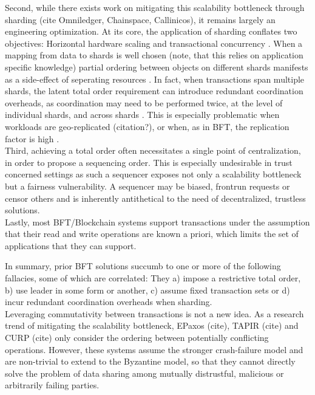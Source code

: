 Second, while there exists work on mitigating this scalability bottleneck through sharding (cite Omniledger, Chainspace, Callinicos), it remains largely an engineering optimization. At its core, the application of sharding conflates two objectives: Horizontal hardware scaling and transactional concurrency . When a mapping from data to shards is well chosen (note, that this relies on application specific knowledge) partial ordering between objects on different shards manifests as a side-effect of seperating resources . In fact, when transactions span multiple shards, the latent total order requirement can introduce redundant coordination overheads, as coordination may need to be performed twice, at the level of individual shards, and across shards \cite{zhang2016operation}. This is especially problematic when workloads are geo-replicated (citation?), or when, as in BFT, the replication factor is high . \\

Third, achieving a total order often  necessitates a single point of centralization, in order to propose a sequencing order. This is especially undesirable in trust concerned settings as such a sequencer exposes not only a scalability bottleneck but a fairness vulnerability. A sequencer may be biased, frontrun requests or censor others and is inherently antithetical to the need of decentralized, trustless solutions.\\

Lastly, most BFT/Blockchain systems support transactions under the assumption that their read and write operations are known a priori, which limits the set of applications that they can support. 


In summary, prior BFT solutions succumb to one or more of the following fallacies, some of which are correlated: They a) impose a restrictive total order, b) use leader in some form or another, c) assume fixed transaction sets or d) incur redundant coordination overheads when sharding. \\

Leveraging commutativity between transactions is not a new idea. As a research trend of mitigating the scalability bottleneck, EPaxos (cite), TAPIR (cite) and CURP (cite) only consider the ordering between potentially conflicting operations. However, these systems assume the stronger crash-failure model and are non-trivial to extend to the Byzantine model, so that they cannot directly solve the problem of data sharing among mutually distrustful, malicious or arbitrarily failing parties.
\fi

